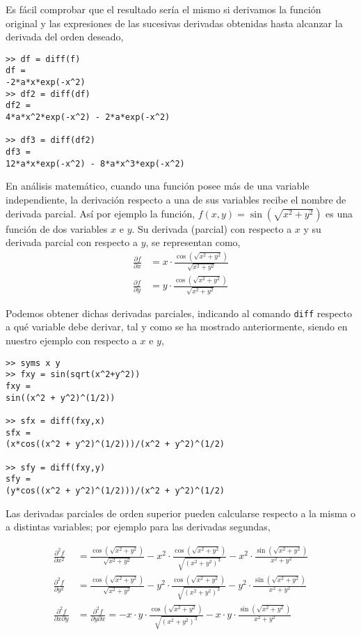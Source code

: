 Es fácil comprobar que el resultado sería el mismo si derivamos la función original y las expresiones de las sucesivas derivadas obtenidas hasta alcanzar la derivada del orden deseado,
\begin{verbatim}
>> df = diff(f) 
df = 
-2*a*x*exp(-x^2)
>> df2 = diff(df) 
df2 = 
4*a*x^2*exp(-x^2) - 2*a*exp(-x^2)
 
>> df3 = diff(df2) 
df3 = 
12*a*x*exp(-x^2) - 8*a*x^3*exp(-x^2) 
\end{verbatim}
En análisis matemático, cuando una función posee más de una variable independiente, la derivación respecto a una de sus variables recibe el nombre de derivada parcial. Así por ejemplo la función,
$f(x,y) =\sin \left( \sqrt{x^2+y^2} \right)$ es una función de dos variables $x$ e $y$. Su derivada (parcial) con respecto a $x$ y su derivada parcial con respecto a $y$, se representan como,
\begin{align*}
\frac{\partial f}{\partial x} &= x\cdot\frac{\cos(\sqrt{x^2+y^2})}{\sqrt{x^2+y^2}} \\
\frac{\partial f}{\partial y} &= y\cdot\frac{\cos(\sqrt{x^2+y^2})}{\sqrt{x^2+y^2}}
\end{align*}

Podemos obtener dichas derivadas parciales, indicando al comando \texttt{diff} respecto a qué variable debe derivar, tal y como se ha mostrado anteriormente, siendo en nuestro ejemplo con respecto a $x$ e $y$,
\begin{verbatim}
>> syms x y
>> fxy = sin(sqrt(x^2+y^2)) 
fxy = 
sin((x^2 + y^2)^(1/2))
 
>> sfx = diff(fxy,x) 
sfx = 
(x*cos((x^2 + y^2)^(1/2)))/(x^2 + y^2)^(1/2)
 
>> sfy = diff(fxy,y) 
sfy = 
(y*cos((x^2 + y^2)^(1/2)))/(x^2 + y^2)^(1/2)
\end{verbatim} 

Las derivadas parciales de orden superior pueden calcularse respecto a la misma o a distintas variables; por ejemplo para las derivadas segundas,

\begin{align*}
\frac{\partial^2f}{\partial x^2} &= \frac{\cos(\sqrt{x^2+y^2})}{\sqrt{x^2+y^2}} - 
x^2 \cdot \frac{\cos(\sqrt{x^2+y^2})}{\sqrt{(x^2+y^2)^3}} -
x^2 \cdot \frac{\sin(\sqrt{x^2+y^2})}{x^2+y^2} \\
\frac{\partial^2f}{\partial y^2} &= \frac{\cos(\sqrt{x^2+y^2})}{\sqrt{x^2+y^2}} - 
y^2 \cdot \frac{\cos(\sqrt{x^2+y^2})}{\sqrt{(x^2+y^2)^3}} -
y^2 \cdot \frac{\sin(\sqrt{x^2+y^2})}{x^2+y^2} \\
\frac{\partial^2f}{\partial x\partial y} &= \frac{\partial^2f}{\partial y\partial x} =-x\cdot y\cdot\frac{\cos(\sqrt{x^2+y^2})}{\sqrt{(x^2+y^2)^3}} - 
x\cdot y \cdot\frac{\sin(\sqrt{x^2+y^2})}{x^2+y^2} 
\end{align*}

